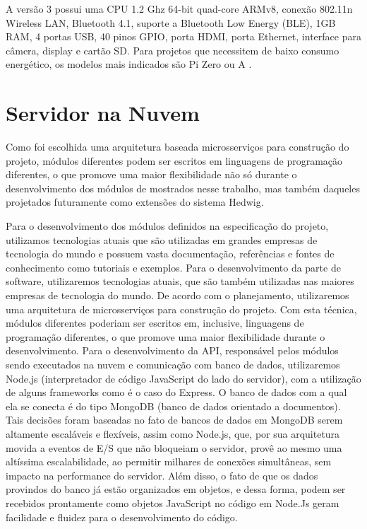 A versão 3 possui uma CPU 1.2 Ghz 64-bit quad-core ARMv8, conexão 802.11n Wireless LAN, Bluetooth 4.1, suporte a Bluetooth Low Energy (BLE), 1GB RAM, 4 portas USB, 40 pinos GPIO, porta HDMI, porta Ethernet, interface para câmera, display e cartão SD. Para projetos que necessitem de baixo consumo energético, os modelos mais indicados são Pi Zero ou A\+ \cite{raspPi}.

\section{Servidor na Nuvem}
Como foi escolhida uma arquitetura baseada microsserviços para construção do projeto, módulos diferentes podem ser escritos em linguagens de programação diferentes, o que promove uma maior flexibilidade não só durante o desenvolvimento dos módulos de mostrados nesse trabalho, mas também daqueles projetados futuramente como extensões do sistema Hedwig.

Para o desenvolvimento dos módulos definidos na especificação do projeto, utilizamos tecnologias atuais que são utilizadas em grandes empresas de tecnologia do mundo e possuem vasta documentação, referências e fontes de conhecimento como tutoriais e exemplos.
Para o desenvolvimento da parte de software, utilizaremos tecnologias atuais, que são também utilizadas nas maiores empresas de tecnologia do mundo. De acordo com o planejamento, utilizaremos uma arquitetura de microsserviços para construção do projeto. Com esta técnica, módulos diferentes poderiam ser escritos em, inclusive, linguagens de programação diferentes, o que promove uma maior flexibilidade durante o desenvolvimento.
Para o desenvolvimento da API, responsável pelos módulos sendo executados na nuvem e comunicação com banco de dados, utilizaremos Node.js (interpretador de código JavaScript do lado do servidor), com a utilização de alguns frameworks como é o caso do Express. O banco de dados com a qual ela se conecta é do tipo MongoDB (banco de dados orientado a documentos). Tais decisões foram baseadas no fato de bancos de dados em MongoDB serem altamente escaláveis e flexíveis, assim como Node.js, que, por sua arquitetura movida a eventos de E/S que não bloqueiam o servidor, provê ao mesmo uma altíssima escalabilidade, ao permitir milhares de conexões simultâneas, sem impacto na performance do servidor. Além disso, o fato de que os dados provindos do banco já estão organizados em objetos, e dessa forma, podem ser recebidos prontamente como objetos JavaScript no código em Node.Js geram facilidade e fluidez para o desenvolvimento do código.

